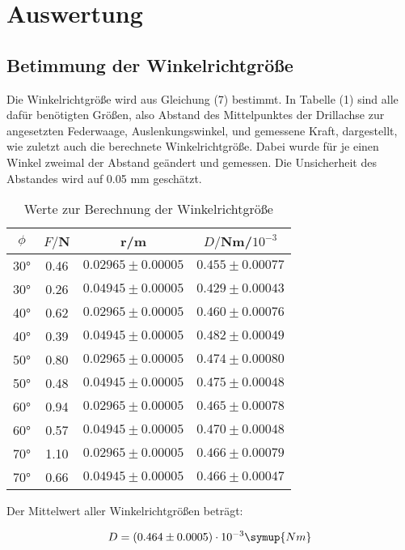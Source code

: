 \section{Auswertung}
\label{sec:Auswertung}

\subsection{Betimmung der Winkelrichtgröße}
Die Winkelrichtgröße wird aus Gleichung (7) bestimmt. In Tabelle (1) sind alle dafür benötigten Größen, also 
Abstand des Mittelpunktes der Drillachse zur angesetzten Federwaage, Auslenkungswinkel, und gemessene Kraft, dargestellt, 
wie zuletzt auch die berechnete Winkelrichtgröße. Dabei wurde für je einen Winkel zweimal der Abstand geändert und
gemessen. Die Unsicherheit des Abstandes wird auf 0.05 mm geschätzt.


\begin{table}[H]
  \centering
  \caption{Werte zur Berechnung der Winkelrichtgröße}
  \label{tab:Parameter}
  \begin{tabular}{c c c c}
    \toprule
    $\phi$ & $F/$N & r/m & $D/$Nm/$10^{-3}$\\
    \bottomrule
     30° & 0.46  & $0.02965 \pm 0.00005$ & $0.455 \pm 0.00077$ \\
     30° & 0.26  & $0.04945 \pm 0.00005$ & $0.429 \pm 0.00043$\\
     40° & 0.62  & $0.02965 \pm 0.00005$ & $0.460 \pm 0.00076$\\
     40° & 0.39  & $0.04945 \pm 0.00005$ & $0.482 \pm 0.00049$\\
     50° & 0.80  & $0.02965 \pm 0.00005$ & $0.474 \pm 0.00080$\\
     50° & 0.48  & $0.04945 \pm 0.00005$ & $0.475 \pm 0.00048$\\
     60° & 0.94  & $0.02965 \pm 0.00005$ & $0.465 \pm 0.00078$\\
     60° & 0.57  & $0.04945 \pm 0.00005$ & $0.470 \pm 0.00048$\\
     70° & 1.10  & $0.02965 \pm 0.00005$ & $0.466 \pm 0.00079$\\
     70° & 0.66  & $0.04945 \pm 0.00005$ & $0.466 \pm 0.00047$\\
    \bottomrule
  \end{tabular}
\end{table}

Der Mittelwert aller Winkelrichtgrößen beträgt:

\begin{equation}
  D = (0.464 \pm 0.0005)\cdot 10^{-3} \symup{Nm}
\end{equation}






